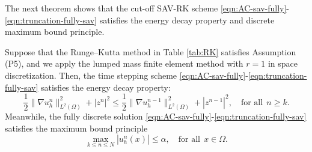 \documentclass[10pt,final,leqno,onefignum,onetabnum]{siamltex}%
\def\II{(\Omega)}
\begin{document}
The next theorem shows that the cut-off SAV-RK scheme \eqref{eqn:AC-sav-fully}-\eqref{eqn:truncation-fully-sav}
satisfies the energy decay property and discrete maximum bound principle.
\begin{theorem}\label{thm:energy-decay}
Suppose that the Runge--Kutta method in Table \ref{tab:RK} satisfies Assumption (P5),
and we apply the  lumped mass
finite element method with $r=1$ in space discretization.
Then, the time stepping scheme \eqref{eqn:AC-sav-fully}-\eqref{eqn:truncation-fully-sav} satisfies the energy decay property:
\begin{equation}\label{eqn:sav-energy}
\frac12\|  \nabla u_h^n \|_{L^2\II}^2 +  |z^{n}|^2 \le \frac12\|  \nabla u_h^{n-1} \|_{L^2\II}^2 +  |z^{n-1}|^2,\quad \text{for all}~~ n\ge k.
\end{equation}
Meanwhile,  the fully discrete solution \eqref{eqn:AC-sav-fully}-\eqref{eqn:truncation-fully-sav} satisfies the maximum bound principle
\begin{equation}\label{eqn:sav-max}
 \max_{k \le n\le N} | u_h^n (x) | \le \alpha, \quad \text{for all}~~ x\in \Omega.
 \end{equation}
\end{theorem}
\end{document}
